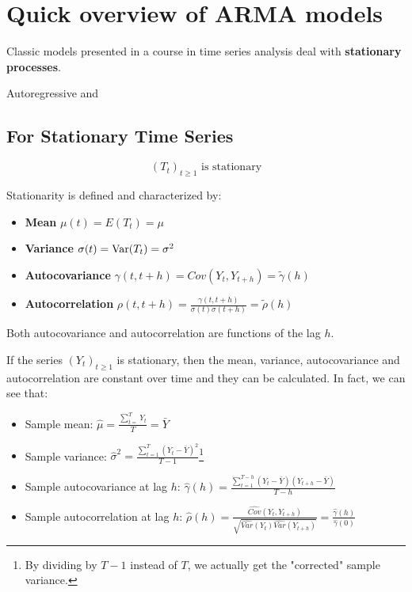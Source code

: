 \section{Quick overview of ARMA models}

    Classic models presented in a course in time series analysis deal with \textbf{stationary processes}.

    Autoregressive and 

    \subsection{For Stationary Time Series}

        \[
        (T_t)_{t \geq 1} \text{ is stationary} 
        \]

        Stationarity is defined and characterized by:
        
            \begin{itemize}
                \item \textbf{Mean} \( \mu(t) = E(T_t) = \mu \)
                \item \textbf{Variance} \(\sigma(t) = \text{Var}(T_t) =  \sigma^2\)
                \item \textbf{Autocovariance} \( \gamma(t, t+h) = Cov(Y_t, Y_{t+h}) = \tilde{\gamma}(h) \)
                \item \textbf{Autocorrelation}  \( \rho(t, t+h) = \frac{\gamma(t, t+h)}{\sigma(t)\sigma(t+h)} = \tilde{\rho}(h)\)
            \end{itemize}

        Both autocovariance and autocorrelation are functions of the lag $h$.

        If the series \((Y_t)_{t \geq 1}\) is stationary, then the mean, variance, autocovariance and autocorrelation are constant over time and they can be calculated. In fact, we can see that:
            
            \begin{itemize}
                \item Sample mean: \(\hat{\mu} = \frac{\sum_{t=}^{T} Y_t}{T} = \bar{Y}\)
                \item Sample variance: \(\hat{\sigma}^2 = \frac{\sum_{t=1}^{T} (Y_t - \bar{Y})^2}{T-1}\)\footnote{By dividing by $T-1$ instead of $T$, we actually get the "corrected" sample variance.}
                \item Sample autocovariance at lag \(h\): \(\hat{\gamma}(h) = \frac{\sum_{t=1}^{T-h} (Y_t - \bar{Y})(Y_{t+h} - \bar{Y})}{T-h}\)
                \item Sample autocorrelation at lag \(h\): \(\hat{\rho}(h) = \frac{\hat{Cov}(Y_t, Y_{t+h})}{\sqrt{\hat{Var}(Y_t)\hat{Var}(Y_{t+h})}} = \frac{\hat{\gamma}(h)}{\hat{\gamma}(0)}\)
            \end{itemize}

